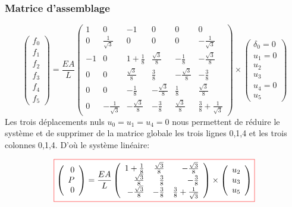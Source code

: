 \documentclass{beamer}
\newcommand{\myredbox}[1]{\fcolorbox{red}{white}{$\displaystyle#1$}}
\begin{document}
\begin{frame}
\frametitle{Matrice d'assemblage}
\[\left(\begin{array}{r}f_0\\ f_1\\f_2\\f_3\\f_4\\f_5 \end{array}\right) 
 =\frac{EA}{L}\left(\begin{array}{rrccrr} 
1&0&-1&0&0&0\\
0&\frac{1}{\sqrt 3}&0&0&0&-\frac{1}{\sqrt 3}\\
-1&0&1+\frac 18&\frac{\sqrt 3}{8}&-\frac 18&-\frac{\sqrt 3}{8}\\
0&0&\frac{\sqrt 3}{8}&\frac 38&-\frac{\sqrt 3}{8}&-\frac 38\\
0&0&-\frac 18&-\frac{\sqrt 3}{8}&\frac 18&\frac{\sqrt 3}{8}\\
0&-\frac{1}{\sqrt 3}&-\frac{\sqrt 3}{8}&-\frac 38&\frac{\sqrt 3}{8}&\frac{ 3}{8}+\frac{1}{\sqrt 3}
\end{array}\right)
\times
\left(\begin{array}{l}  \delta_0=0\\ u_1=0\\ u_2\\ u_3\\ u_4=0\\ u_5   \end{array}\right)
\]
Les trois déplacements nuls $u_0=u_1=u_4=0$ nous permettent de réduire le système et de supprimer de la matrice globale les trois lignes 0,1,4 et les trois colonnes 0,1,4. D'où le système linéaire:

\[\myredbox{
\left(\begin{array}{r} 0\\P\\0 \end{array}\right) 
=
\frac{EA}{L}\left(\begin{array}{rrr} 
1+\frac 18&\frac{\sqrt 3}{8}&-\frac{\sqrt 3}{8}\\
\frac{\sqrt 3}{8}&\frac 38&-\frac 38\\
-\frac{\sqrt 3}{8}&-\frac 38&\frac{ 3}{8}+\frac{1}{\sqrt 3}
\end{array}\right)
\times
\left(\begin{array}{r}   u_2\\ u_3\\ u_5  \end{array}\right) }
\]
\end{frame}
\end{document}
